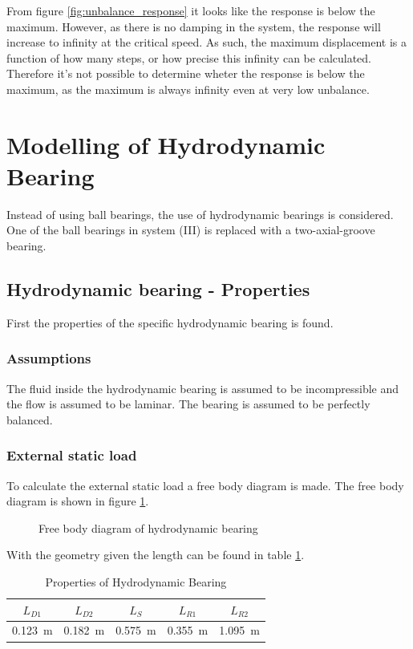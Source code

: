 From figure \ref{fig:unbalance_response} it looks like the response is below the maximum. However, as there is no damping in the system,
the response will increase to infinity at the critical speed. As such, the maximum displacement is a function of how many steps, or how precise this infinity can be calculated.
Therefore it's not possible to determine wheter the response is below the maximum, as the maximum is always infinity even at very low unbalance.

\section{Modelling of Hydrodynamic Bearing}
Instead of using ball bearings, the use of hydrodynamic bearings is considered. One of the ball bearings in system (III) is replaced with a two-axial-groove bearing.

\subsection{Hydrodynamic bearing - Properties}
First the properties of the specific hydrodynamic bearing is found.

\subsubsection{Assumptions}
The fluid inside the hydrodynamic bearing is assumed to be incompressible and the flow is assumed to be laminar. The bearing is assumed to be perfectly balanced.


\subsubsection{External static load}
To calculate the external static load a free body diagram is made. The free body diagram is shown in figure \ref{fig:free_body_diagram}.
\begin{figure}[htbp]
    \centering
    
    \caption{Free body diagram of hydrodynamic bearing}
    \label{fig:free_body_diagram}
\end{figure}

With the geometry given the length can be found in table \ref{tab:hydrodynamic_bearing_properties}.
\begin{table}[htbp]
    \centering
    \caption{Properties of Hydrodynamic Bearing}
    \label{tab:hydrodynamic_bearing_properties}
    \begin{tabular}{@{}ccccc@{}}
        \toprule
        $L_{D1}$    &   $L_{D2}$    &   $L_S$   &   $L_{R1}$   &   $L_{R2}$   \\ \midrule
        \SI{0.123}{\meter}  &   \SI{0.182}{\meter}  &   \SI{0.575}{\meter}   &   \SI{0.355}{\meter}   &   \SI{1.095}{\meter}   \\ \bottomrule
    \end{tabular}
\end{table}

